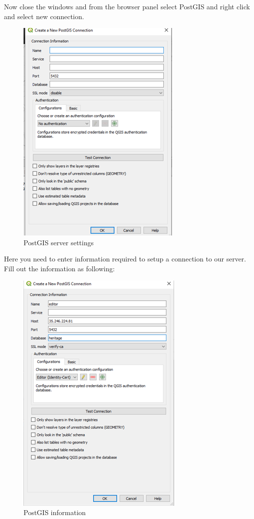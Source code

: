 \documentclass[
]{book}
\begin{document}
Now close the windows and from the browser panel select PostGIS and right click and select new connection.

\begin{figure}
\centering
\includegraphics{Images/postgisServer.png}
\caption{PostGIS server settings}
\end{figure}

Here you need to enter information required to setup a connection to our server. Fill out the information as following:

\begin{figure}
\centering
\includegraphics{Images/postGISinfo.png}
\caption{PostGIS information}
\end{figure}
\end{document}
